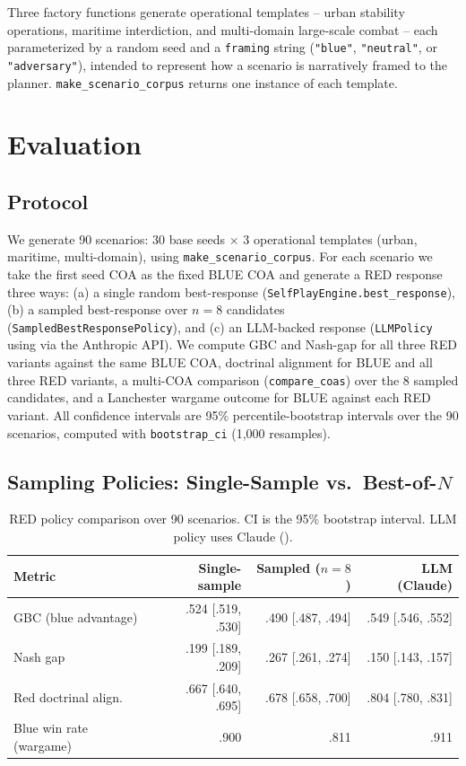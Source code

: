 \documentclass[sigconf]{acmart}
\begin{document}
Three factory functions generate operational templates -- urban stability operations, maritime interdiction, and multi-domain large-scale combat -- each parameterized by a random seed and a \texttt{framing} string (\texttt{"blue"}, \texttt{"neutral"}, or \texttt{"adversary"}), intended to represent how a scenario is narratively framed to the planner. \texttt{make\_scenario\_corpus} returns one instance of each template.

\section{Evaluation}

\subsection{Protocol}

We generate 90 scenarios: 30 base seeds $\times$ 3 operational templates (urban, maritime, multi-domain), using \texttt{make\_scenario\_corpus}. For each scenario we take the first seed COA as the fixed BLUE COA and generate a RED response three ways: (a) a single random best-response (\texttt{SelfPlayEngine.best\_response}), (b) a sampled best-response over $n=8$ candidates (\texttt{SampledBestResponsePolicy}), and (c) an LLM-backed response (\texttt{LLMPolicy} using  via the Anthropic API). We compute GBC and Nash-gap for all three RED variants against the same BLUE COA, doctrinal alignment for BLUE and all three RED variants, a multi-COA comparison (\texttt{compare\_coas}) over the 8 sampled candidates, and a Lanchester wargame outcome for BLUE against each RED variant. All confidence intervals are 95\% percentile-bootstrap intervals over the 90 scenarios, computed with \texttt{bootstrap\_ci} (1{,}000 resamples).

\subsection{Sampling Policies: Single-Sample vs.\ Best-of-$N$}

\begin{table}[t]
\caption{RED policy comparison over 90 scenarios. CI is the 95\% bootstrap interval. LLM policy uses Claude ().}
\label{tab:main}
\small
\begin{tabular}{lrrr}
\toprule
Metric & Single-sample & Sampled ($n{=}8$) & LLM (Claude) \\
\midrule
GBC (blue advantage) & .524 [.519, .530] & .490 [.487, .494] & .549 [.546, .552] \\
Nash gap & .199 [.189, .209] & .267 [.261, .274] & .150 [.143, .157] \\
Red doctrinal align. & .667 [.640, .695] & .678 [.658, .700] & .804 [.780, .831] \\
Blue win rate (wargame) & .900 & .811 & .911 \\
\bottomrule
\end{tabular}
\end{table}
\end{document}
